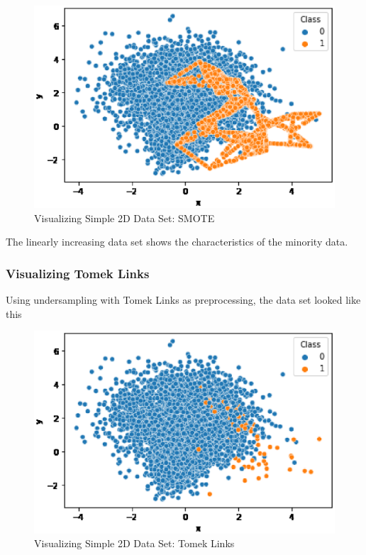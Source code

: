 \begin{center}
    \begin{figure}[ht]
        \caption{Visualizing Simple 2D Data Set: SMOTE}
        \label{tab:team-rating-features}
        \begin{center}
            \includegraphics[scale=0.6]{image/smote.eps}
        \end{center}
    \end{figure}
\end{center}
The linearly increasing data set shows the characteristics of the minority data.

\clearpage
\subsubsection{Visualizing Tomek Links}
Using undersampling with Tomek Links as preprocessing, the data set looked like this

\begin{center}
    \begin{figure}[ht]
        \caption{Visualizing Simple 2D Data Set: Tomek Links}
        \label{tab:team-rating-features}
        \begin{center}
            \includegraphics[scale=0.6]{image/tomek-links.eps}
        \end{center}
    \end{figure}
\end{center}

